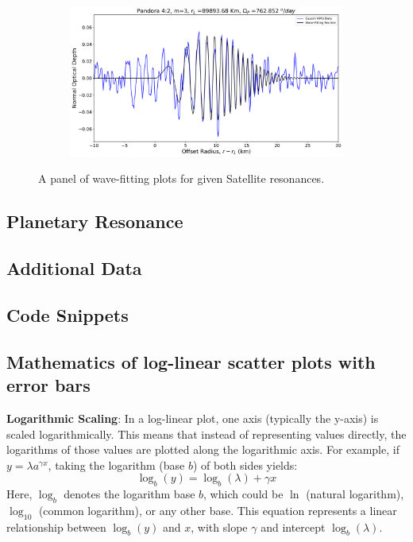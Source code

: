 \documentclass{article}
\begin{document}
\begin{figure}[h]
    \begin{subfigure}{0.35\linewidth}
        \includegraphics[width=\linewidth]{pandora_42_wavefit.png}
        \label{fig:pandora42}
    \end{subfigure}

    \caption{A panel of wave-fitting plots for given Satellite resonances.}
    \label{fig:common-label}
\end{figure}



\subsection{Planetary Resonance}
\label{subsec:data}

\subsection{Additional Data}
\label{subsec:data}


\subsection{Code Snippets}
\label{subsec:code}


\subsection{Mathematics of log-linear scatter plots with error bars}

\textbf{Logarithmic Scaling}:
In a log-linear plot, one axis (typically the y-axis) is scaled logarithmically. This means that instead of representing values directly, the logarithms of those values are plotted along the logarithmic axis. For example, if $y = \lambda a^{\gamma x}$, taking the logarithm (base $b$) of both sides yields:
     \[ \log_b(y) = \log_b(\lambda) + \gamma x \]
Here, $\log_b$ denotes the logarithm base $b$, which could be $\ln$ (natural logarithm), $\log_{10}$ (common logarithm), or any other base. This equation represents a linear relationship between $\log_b(y)$ and $x$, with slope $\gamma$ and intercept $\log_b(\lambda)$.
\end{document}
